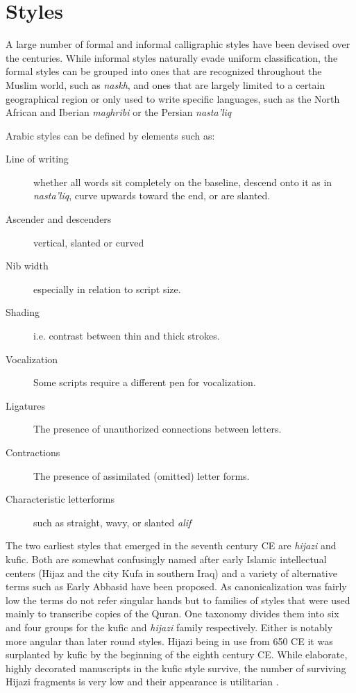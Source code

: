\section{Styles}

A large number of formal and informal calligraphic styles have been devised
over the centuries. While informal styles naturally evade uniform
classification, the formal styles can be grouped into ones that are recognized
throughout the Muslim world, such as \emph{naskh}, and ones that are largely
limited to a certain geographical region or only used to write specific
languages, such as the North African and Iberian \emph{maghribi} or the Persian
\emph{nasta'liq}  

Arabic styles can be defined by elements such as\cite[pg. 242-243]{gacek2009arabic}:

\begin{description}
	\item[Line of writing] whether all words sit completely on the
			       baseline, descend onto it as in
			       \emph{nasta'liq}, curve upwards toward the end,
			       or are slanted.
	\item[Ascender and descenders] vertical, slanted or curved
	\item[Nib width] especially in relation to script size.
	\item[Shading] i.e. contrast between thin and thick strokes.
	\item[Vocalization] Some scripts require a different pen for vocalization.
	\item[Ligatures] The presence of unauthorized connections between letters.
	\item[Contractions] The presence of assimilated (omitted) letter forms.
	\item[Characteristic letterforms] such as straight, wavy, or slanted \emph{alif}
\end{description}

The two earliest styles that emerged in the seventh century CE are
\emph{hijazi} and kufic. Both are somewhat confusingly named after early
Islamic intellectual centers (Hijaz and the city Kufa in southern Iraq) and a
variety of alternative terms such as Early Abbasid have been proposed. As
canonicalization was fairly low the terms do not refer singular hands but to
families of styles that were used mainly to transcribe copies of the Quran. One
taxonomy divides them into six and four groups for the kufic and \emph{hijazi}
family respectively. Either is notably more angular than later round styles.
Hijazi being in use from 650 CE it was surplanted by kufic by the beginning of
the eighth century CE. While elaborate, highly decorated manuscripts in the
kufic style survive, the number of surviving Hijazi fragments is very low and
their appearance is utilitarian \cite[pg. 98, 124]{gacek2009arabic}.

